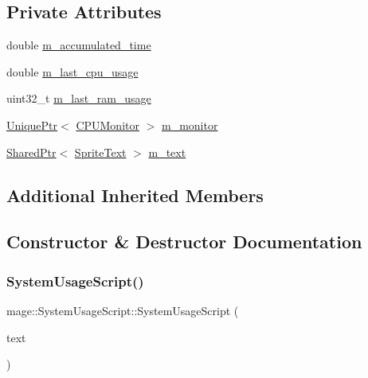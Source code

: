 \subsection*{Private Attributes}
\begin{DoxyCompactItemize}
\item 
double \hyperlink{classmage_1_1_system_usage_script_ab8df9ff99617df9010c4c2f27a6ff9c8}{m\+\_\+accumulated\+\_\+time}
\item 
double \hyperlink{classmage_1_1_system_usage_script_a4a49987cd15cdc2fa3d550a542191621}{m\+\_\+last\+\_\+cpu\+\_\+usage}
\item 
uint32\+\_\+t \hyperlink{classmage_1_1_system_usage_script_a64538d152d33546516a6acdda939b619}{m\+\_\+last\+\_\+ram\+\_\+usage}
\item 
\hyperlink{namespacemage_a8c307fbcc33bce9b7f2aa4c26c3b95cf}{Unique\+Ptr}$<$ \hyperlink{classmage_1_1_c_p_u_monitor}{C\+P\+U\+Monitor} $>$ \hyperlink{classmage_1_1_system_usage_script_a45574bef4a526bdd99108e92bf12dcbd}{m\+\_\+monitor}
\item 
\hyperlink{namespacemage_a1e01ae66713838a7a67d30e44c67703e}{Shared\+Ptr}$<$ \hyperlink{classmage_1_1_sprite_text}{Sprite\+Text} $>$ \hyperlink{classmage_1_1_system_usage_script_af6dd5e39889458ffb042f1d13fbcd7ea}{m\+\_\+text}
\end{DoxyCompactItemize}
\subsection*{Additional Inherited Members}


\subsection{Constructor \& Destructor Documentation}
\hypertarget{classmage_1_1_system_usage_script_a430d87647bdc6e407838863b1fcb750d}{}\label{classmage_1_1_system_usage_script_a430d87647bdc6e407838863b1fcb750d} 
\subsubsection{\texorpdfstring{System\+Usage\+Script()}{SystemUsageScript()}\hspace{0.1cm}{\footnotesize\ttfamily [1/3]}}
{\footnotesize\ttfamily mage\+::\+System\+Usage\+Script\+::\+System\+Usage\+Script (\begin{DoxyParamCaption}\item[{\hyperlink{namespacemage_a1e01ae66713838a7a67d30e44c67703e}{Shared\+Ptr}$<$ \hyperlink{classmage_1_1_sprite_text}{Sprite\+Text} $>$}]{text }\end{DoxyParamCaption})\hspace{0.3cm}{\ttfamily [explicit]}}

